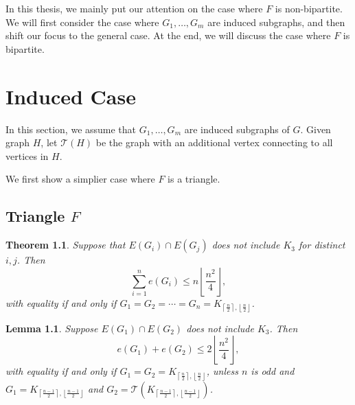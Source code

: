 \documentclass[12pt]{report}
\newtheorem{theorem}{Theorem}[chapter]
\newtheorem{lemma}{Lemma}[theorem]
\begin{document}
In this thesis, we mainly put our attention on the case where $F$ is non-bipartite. We will first
consider the case where $G_1, \ldots, G_m$ are induced subgraphs, and then shift our focus to the
general case. At the end, we will discuss the case where $F$ is bipartite.

\chapter{Induced Case}

In this section, we assume that $G_1, \ldots, G_m$ are induced subgraphs of $G$. Given graph $H$,
let $\mathcal{T}(H)$ be the graph with an additional vertex connecting to all vertices in $H$.

We first show a simplier case where $F$ is a triangle.

\section{Triangle $F$}

\begin{theorem}
  Suppose that $E(G_i) \cap E(G_j)$ does not include $K_3$ for distinct $i, j$. Then
  \[
    \sum_{i = 1}^n e(G_i) \leq n\left\lfloor\frac{n^2}{4}\right\rfloor,
  \]
  with equality if and only if $G_1 = G_2 = \cdots = G_n = K_{\left\lceil\frac{n}{2}\right\rceil,
  \left\lfloor\frac{n}{2}\right\rfloor}$.
\end{theorem}

\begin{lemma}
  Suppose $E(G_1) \cap E(G_2)$ does not include $K_3$. Then
  \[
    e(G_1) + e(G_2) \leq 2\left\lfloor\frac{n^2}{4}\right\rfloor,
  \]
  with equality if and only if $G_1 = G_2 = K_{\left\lceil\frac{n}{2}\right\rceil,
  \left\lfloor\frac{n}{2}\right\rfloor}$, unless $n$ is odd and $G_1 = K_{\left\lceil\frac{n -
  1}{2}\right\rceil, \left\lfloor\frac{n - 1}{2}\right\rfloor}$ and $G_2 =
  \mathcal{T}(K_{\left\lceil\frac{n - 1}{2}\right\rceil, \left\lfloor\frac{n -
  1}{2}\right\rfloor})$.
\end{lemma}
\end{document}
